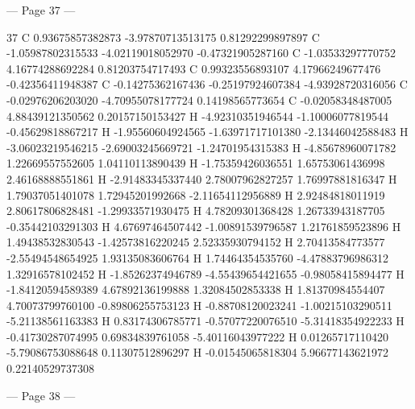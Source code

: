 --- Page 37 ---
 
37 
  C   0.93675857382873     -3.97870713513175      0.81292299897897 
  C   -1.05987802315533     -4.02119018052970     -0.47321905287160 
  C   -1.03533297770752      4.16774288692284      0.81203754717493 
  C   0.99323556893107      4.17966249677476     -0.42356411948387 
  C   -0.14275362167436     -0.25197924607384     -4.93928720316056 
  C   -0.02976206203020     -4.70955078177724      0.14198565773654 
  C   -0.02058348487005      4.88439121350562      0.20157150153427 
  H   -4.92310351946544     -1.10006077819544     -0.45629818867217 
  H   -1.95560604924565     -1.63971717101380     -2.13446042588483 
  H   -3.06023219546215     -2.69003245669721     -1.24701954315383 
  H   -4.85678960071782      1.22669557552605      1.04110113890439 
  H   -1.75359426036551      1.65753061436998      2.46168888551861 
  H   -2.91483345337440      2.78007962827257      1.76997881816347 
  H   1.79037051401078      1.72945201992668     -2.11654112956889 
  H   2.92484818011919      2.80617806828481     -1.29933571930475 
  H   4.78209301368428      1.26733943187705     -0.35442103291303 
  H   4.67697464507442     -1.00891539796587      1.21761859523896 
  H   1.49438532830543     -1.42573816220245      2.52335930794152 
  H   2.70413584773577     -2.55494548654925      1.93135083606764 
  H   1.74464354535760     -4.47883796986312      1.32916578102452 
  H   -1.85262374946789     -4.55439654421655     -0.98058415894477 
  H   -1.84120594589389      4.67892136199888      1.32084502853338 
  H   1.81370984554407      4.70073799760100     -0.89806255753123 
  H   -0.88708120023241     -1.00215103290511     -5.21138561163383 
  H   0.83174306785771     -0.57077220076510     -5.31418354922233 
  H   -0.41730287074995      0.69834839761058     -5.40116043977222 
  H   0.01265717110420     -5.79086753088648      0.11307512896297 
  H   -0.01545065818304      5.96677143621972      0.22140529737308 
 
 


--- Page 38 ---
 
